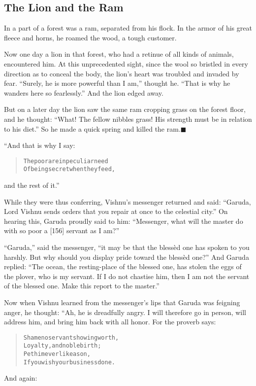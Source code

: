 \documentclass[article, twoside, 14pt]{memoir}
\newcommand{\qed}{\hfill \ensuremath{\blacksquare}}
\renewenvironment{verbatim}{%
\begin{quote}%
\vskip -10pt%
\begin{alltt}\normalfont\large}{\end{alltt}%
\end{quote}%
\vskip -10pt
} %
\begin{document}
\subsection{The Lion and the Ram}

\label{s23}

In a part of a forest was a ram, separated from his flock. In the
armor of his great fleece and horns, he roamed the wood, a tough
customer.

Now one day a lion in that forest, who had a retinue of all kinds
of animals, encountered him. At this unprecedented sight, since the
wool so bristled in every direction as to conceal the body, the
lion's heart was troubled and invaded by fear.
``Surely, he is more powerful than I am,'' thought he.
``That is why he wanders here so fearlessly.'' And the lion edged
away.

But on a later day the lion saw the same ram cropping grass on the
forest floor, and he thought:
``What! The fellow nibbles grass! His strength must be in relation to his diet.''
So he made a quick spring and killed the ram.\hyperref[s23]{\qed}

“And that is why I say:

\begin{verbatim}
The poor are in peculiar need
Of being secret when they feed,
\end{verbatim}
and the rest of it.”

While they were thus conferring, Vishnu's messenger returned and
said:
``Garuda, Lord Vishnu sends orders that you repair at once to the celestial city.''
On hearing this, Garuda proudly said to him:
``Messenger, what will the master do with so poor a [156] servant as I am?''

``Garuda,'' said the messenger,
``it may be that the blessèd one has spoken to you harshly. But why should you display pride toward the blessèd one?''
And Garuda replied:
``The ocean, the resting-place of the blessed one, has stolen the eggs of the plover, who is my servant. If I do not chastise him, then I am not the servant of the blessed one. Make this report to the master.''

Now when Vishnu learned from the messenger's lips that Garuda was
feigning anger, he thought: “Ah, he is dreadfully angry. I will
therefore go in person, will address him, and bring him back with
all honor. For the proverb says:

\begin{verbatim}
Shame no servant showing worth,
Loyalty, and noble birth;
Pet him ever like a son,
If you wish your business done.
\end{verbatim}
And again:
\end{document}
